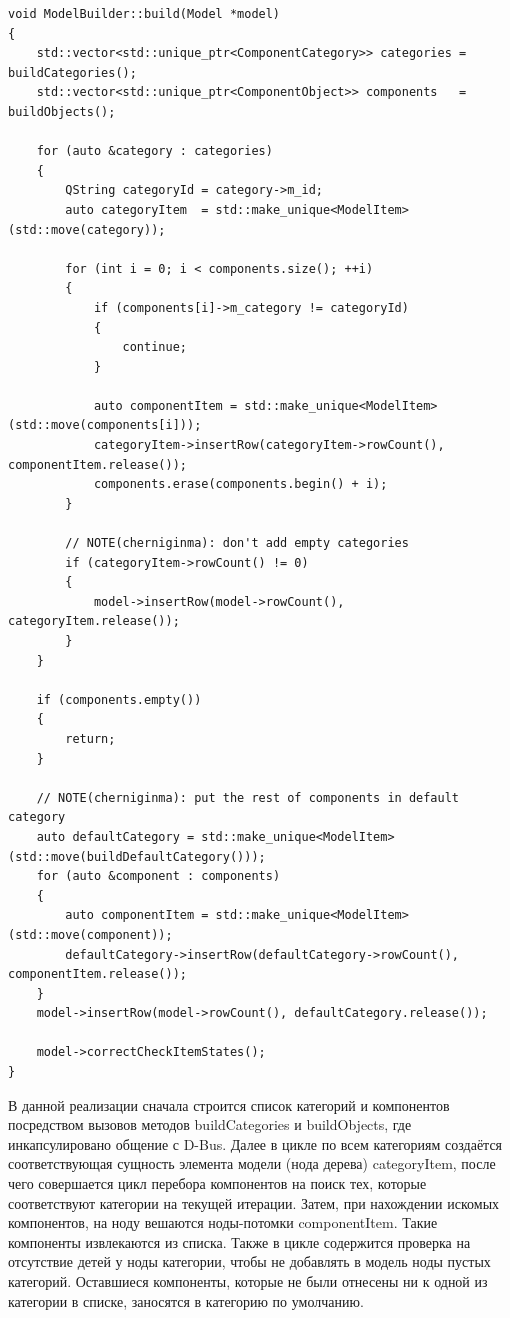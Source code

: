 \documentclass[bachelor, och, pract]{SCWorks}
\begin{document}
\begin{verbatim}
void ModelBuilder::build(Model *model)
{
    std::vector<std::unique_ptr<ComponentCategory>> categories = buildCategories();
    std::vector<std::unique_ptr<ComponentObject>> components   = buildObjects();

    for (auto &category : categories)
    {
        QString categoryId = category->m_id;
        auto categoryItem  = std::make_unique<ModelItem>(std::move(category));

        for (int i = 0; i < components.size(); ++i)
        {
            if (components[i]->m_category != categoryId)
            {
                continue;
            }

            auto componentItem = std::make_unique<ModelItem>(std::move(components[i]));
            categoryItem->insertRow(categoryItem->rowCount(), componentItem.release());
            components.erase(components.begin() + i);
        }

        // NOTE(cherniginma): don't add empty categories
        if (categoryItem->rowCount() != 0)
        {
            model->insertRow(model->rowCount(), categoryItem.release());
        }
    }

    if (components.empty())
    {
        return;
    }

    // NOTE(cherniginma): put the rest of components in default category
    auto defaultCategory = std::make_unique<ModelItem>(std::move(buildDefaultCategory()));
    for (auto &component : components)
    {
        auto componentItem = std::make_unique<ModelItem>(std::move(component));
        defaultCategory->insertRow(defaultCategory->rowCount(), componentItem.release());
    }
    model->insertRow(model->rowCount(), defaultCategory.release());

    model->correctCheckItemStates();
}

\end{verbatim}

В данной реализации сначала строится список категорий и компонентов посредством вызовов методов buildCategories и buildObjects, где инкапсулировано общение с D-Bus.
Далее в цикле по всем категориям создаётся соответствующая сущность элемента модели (нода дерева) categoryItem, после чего совершается цикл перебора компонентов на поиск тех, которые соответствуют категории на текущей итерации.
Затем, при нахождении искомых компонентов, на ноду вешаются ноды-потомки componentItem.
Такие компоненты извлекаются из списка.
Также в цикле содержится проверка на отсутствие детей у ноды категории, чтобы не добавлять в модель ноды пустых категорий.
Оставшиеся компоненты, которые не были отнесены ни к одной из категории в списке, заносятся в категорию по умолчанию.
\end{document}
